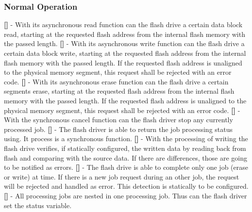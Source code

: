 \subsubsection{Normal Operation}
{\bf []} - With its asynchronous read function can the flash drive a certain data block read, starting at the requested flash address from the internal flash memory with the passed length.\newline
\newline
{\bf []} - With its asynchronous write function can the flash drive a certain data block write, starting at the requested flash address from the internal flash memory with the passed length. If the requested flash address is unaligned to the physical memory segment, this request shall be rejected with an error code.\newline
\newline
{\bf []} - With its asynchronous erase function can the flash drive a certain segments erase, starting at the requested flash address from the internal flash memory with the passed length. If the requested flash address is unaligned to the physical memory segment, this request shall be rejected with an error code.\newline
\newline
{\bf []} - With the synchronous cancel function can the flash driver stop any currently processed job.\newline
\newline
{\bf []} - The flash driver is able to return the job processing status using. It process is a synchronous function.\newline
\newline
{\bf []} - With the processing of writing the flash drive verifies, if statically configured, the written data by reading back from flash and comparing with the source data. If there are differences, those are going to be notified as errors. \newline
\newline
{\bf []} - The flash drive is able to complete only one job (erase or write) at time. If there is a new job request during an other job, the request will be rejected and handled as error. This detection is statically to be configured.\newline
\newline
{\bf []} - All processing jobs are nested in one processing job. Thus can the flash driver set the status variable.\newline
